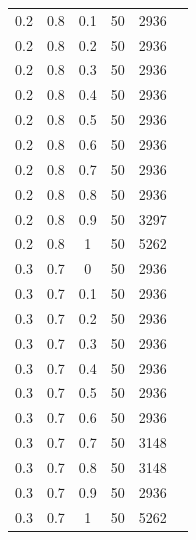 \documentclass[12pt]{report}
\begin{document}
\begin{table}
\begin{minipage}[h!]{0.10\hsize}
\begin{center}
{\begin{tabular}{c@{\hspace{5mm}}c@{\hspace{5mm}}c@{\hspace{5mm}}c@{\hspace{5mm}}c@{\hspace{5mm}}c}
				0.2     &0.8    &0.1    &50    &2936\\
				0.2     &0.8    &0.2    &50    &2936\\
				0.2     &0.8    &0.3    &50    &2936\\
				0.2     &0.8    &0.4    &50   &2936\\
				0.2     &0.8    &0.5    &50   &2936\\
				0.2     &0.8    &0.6    &50    &2936\\
				0.2     &0.8    &0.7    &50    &2936\\
				0.2     &0.8    &0.8    &50    &2936\\
				0.2     &0.8    &0.9    &50    &3297\\
				0.2     &0.8    &1      &50     &5262\\
				\midrule
				0.3     &0.7    &0      &50    &2936\\
				0.3     &0.7    &0.1    &50    &2936\\
				0.3     &0.7    &0.2    &50    &2936\\
				0.3     &0.7    &0.3    &50    &2936\\
				0.3     &0.7    &0.4    &50    &2936\\
				0.3     &0.7    &0.5    &50    &2936\\
				0.3     &0.7    &0.6    &50    &2936\\
				0.3     &0.7    &0.7    &50    &3148\\
				0.3     &0.7    &0.8    &50    &3148\\
				0.3     &0.7    &0.9    &50   &2936\\
				0.3     &0.7    &1      &50    &5262\\
				\bottomrule
			\end{tabular}}
			\label{T:log112}
		\end{center}
	\end{minipage}
	\hfill
	\begin{minipage}[!h]{0.50\hsize}\centering
		\begin{center}
\end{center}
\end{minipage}
\end{table}
\end{document}
